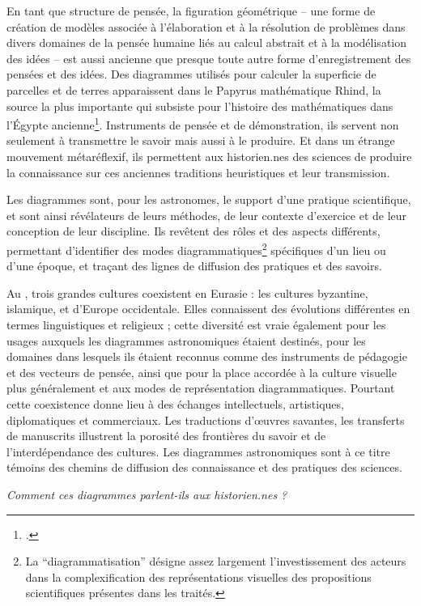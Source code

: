 En tant que structure de pensée, la figuration géométrique -- une forme
de création de modèles associée à l'élaboration et à la résolution de
problèmes dans divers domaines de la pensée humaine liés au calcul
abstrait et à la modélisation des idées -- est aussi ancienne que
presque toute autre forme d'enregistrement des pensées et des idées. Des
diagrammes utilisés pour calculer la superficie de parcelles et de
terres apparaissent dans le Papyrus mathématique Rhind, la source la
plus importante qui subsiste pour l'histoire des mathématiques dans
l'Égypte ancienne\footcite[p.6]{safran_diagram_2022}. Instruments
de pensée et de démonstration, ils servent non seulement à transmettre
le savoir mais aussi à le produire. Et dans un étrange mouvement
métaréflexif, ils permettent aux historien.nes des sciences de produire la
connaissance sur ces anciennes traditions heuristiques et leur
transmission.

Les diagrammes sont, pour les astronomes, le support d'une pratique
scientifique, et sont ainsi révélateurs de leurs méthodes, de leur
contexte d'exercice et de leur conception de leur discipline. Ils
revêtent des rôles et des aspects différents, permettant d'identifier
des modes diagrammatiques\footnote{La ``diagrammatisation'' désigne
  assez largement l'investissement des acteurs dans la complexification
  des représentations visuelles des propositions scientifiques présentes
  dans les traités.} spécifiques d'un lieu ou d'une époque, et traçant
des lignes de diffusion des pratiques et des savoirs.

Au \ma, trois grandes cultures coexistent en Eurasie : les
cultures byzantine, islamique, et d'Europe occidentale. Elles
connaissent des évolutions différentes en termes linguistiques et
religieux ; cette diversité est vraie également pour les usages auxquels
les diagrammes astronomiques étaient destinés, pour les domaines dans
lesquels ils étaient reconnus comme des instruments de pédagogie et des
vecteurs de pensée, ainsi que pour la place accordée à la culture
visuelle plus généralement et aux modes de représentation
diagrammatiques. Pourtant cette coexistence donne lieu à des échanges
intellectuels, artistiques, diplomatiques et commerciaux. Les
traductions d'œuvres savantes, les transferts de manuscrits illustrent
la porosité des frontières du savoir et de l'interdépendance des
cultures. Les diagrammes astronomiques sont à ce titre témoins des
chemins de diffusion des connaissance et des pratiques des sciences.

\emph{Comment ces diagrammes parlent-ils aux historien.nes ?}

